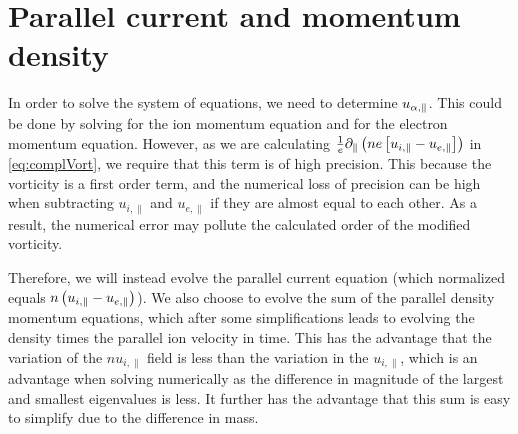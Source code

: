 \section{Parallel current and momentum density}
In order to solve the system of equations, we need to determine $u_{\alpha,\|}$.
This could be done by solving for the ion momentum equation and for the electron momentum equation.
However, as we are calculating $\frac{1}{e}\partial_\|\left(ne\left[u_{i,\|} - u_{e,\|}\right]\right)$ in \cref{eq:complVort}, we require that this term is of high precision.
This because the vorticity is a first order term, and the numerical loss of precision can be high when subtracting $u_{i,\|}$ and $u_{e,\|}$ if they are almost equal to each other.
As a result, the numerical error may pollute the calculated order of the modified vorticity.

Therefore, we will instead evolve the parallel current equation (which normalized equals $n\left(u_{i,\|} - u_{e,\|}\right)$).
We also choose to evolve the sum of the parallel density momentum equations, which after some simplifications leads to evolving the density times the parallel ion velocity in time.
This has the advantage that the variation of the $nu_{i,\|}$ field is less than the variation in the $u_{i,\|}$, which is an advantage when solving numerically as the difference in magnitude of the largest and smallest eigenvalues is less.
It further has the advantage that this sum is easy to simplify due to the difference in mass.










